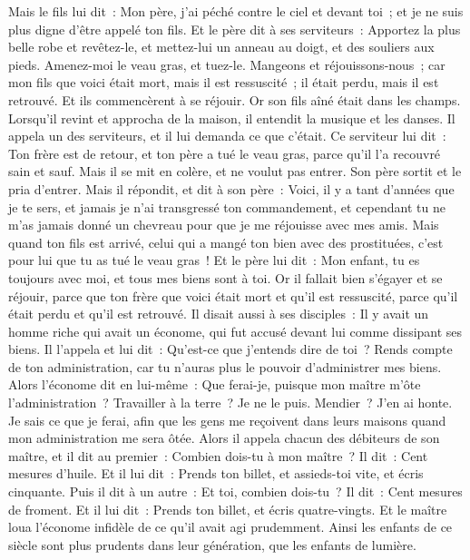 \begin{multicols}{2}
Mais le fils lui dit~: Mon père, j'ai péché contre le ciel et devant toi~; et je ne suis plus digne d'être appelé ton fils.
Et le père dit à ses serviteurs~: Apportez la plus belle robe et revêtez-le, et mettez-lui un anneau au doigt, et des souliers aux pieds.
Amenez-moi le veau gras, et tuez-le. Mangeons et réjouissons-nous~;
car mon fils que voici était mort, mais il est ressuscité~; il était perdu, mais il est retrouvé. Et ils commencèrent à se réjouir.
Or son fils aîné était dans les champs. Lorsqu'il revint et approcha de la maison, il entendit la musique et les danses.
Il appela un des serviteurs, et il lui demanda ce que c'était.
Ce serviteur lui dit~: Ton frère est de retour, et ton père a tué le veau gras, parce qu'il l'a recouvré sain et sauf.
Mais il se mit en colère, et ne voulut pas entrer. Son père sortit et le pria d'entrer.
Mais il répondit, et dit à son père~: Voici, il y a tant d'années que je te sers, et jamais je n'ai transgressé ton commandement, et cependant tu ne m'as jamais donné un chevreau pour que je me réjouisse avec mes amis.
Mais quand ton fils est arrivé, celui qui a mangé ton bien avec des prostituées, c'est pour lui que tu as tué le veau gras~!
Et le père lui dit~: Mon enfant, tu es toujours avec moi, et tous mes biens sont à toi.
Or il fallait bien s'égayer et se réjouir, parce que ton frère que voici était mort et qu'il est ressuscité, parce qu'il était perdu et qu'il est retrouvé.
\VerseOne{}Il disait aussi à ses disciples~: Il y avait un homme riche qui avait un économe, qui fut accusé devant lui comme dissipant ses biens.
Il l'appela et lui dit~: Qu'est-ce que j'entends dire de toi~? Rends compte de ton administration, car tu n'auras plus le pouvoir d'administrer mes biens.
Alors l'économe dit en lui-même~: Que ferai-je, puisque mon maître m'ôte l'administration~? Travailler à la terre~? Je ne le puis. Mendier~? J'en ai honte.
Je sais ce que je ferai, afin que les gens me reçoivent dans leurs maisons quand mon administration me sera ôtée.
Alors il appela chacun des débiteurs de son maître, et il dit au premier~: Combien dois-tu à mon maître~?
Il dit~: Cent mesures d'huile. Et il lui dit~: Prends ton billet, et assieds-toi vite, et écris cinquante.
Puis il dit à un autre~: Et toi, combien dois-tu~? Il dit~: Cent mesures de froment. Et il lui dit~: Prends ton billet, et écris quatre-vingts.
Et le maître loua l'économe infidèle de ce qu'il avait agi prudemment. Ainsi les enfants de ce siècle sont plus prudents dans leur génération, que les enfants de lumière.

\end{multicols}
